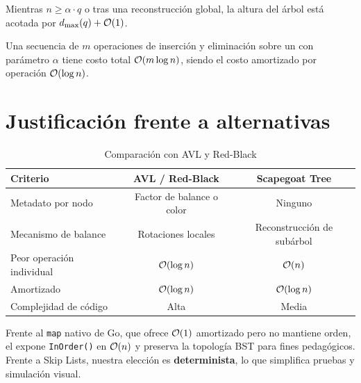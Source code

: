 \begin{invariante}
Mientras $n \geq \alpha \cdot q$ o tras una reconstrucción global, la altura del árbol está acotada por $d_{\max}(q) + \mathcal{O}(1)$.
\end{invariante}

\begin{teorema}
Una secuencia de $m$ operaciones de inserción y eliminación sobre un \Scapegoat{} con parámetro $\alpha$ tiene costo total $\mathcal{O}(m \log n)$, siendo el costo amortizado por operación $\mathcal{O}(\log n)$.
\end{teorema}

\section{Justificación frente a alternativas}

\begin{table}[H]
  \centering
  \caption{Comparación con AVL y Red-Black}
  \begin{tabular}{@{}lcc@{}}
    \toprule
    \textbf{Criterio} & \textbf{AVL / Red-Black} & \textbf{Scapegoat Tree} \\
    \midrule
    Metadato por nodo & Factor de balance o color & Ninguno \\
    Mecanismo de balance & Rotaciones locales & Reconstrucción de subárbol \\
    Peor operación individual & $\mathcal{O}(\log n)$ & $\mathcal{O}(n)$ \\
    Amortizado & $\mathcal{O}(\log n)$ & $\mathcal{O}(\log n)$ \\
    Complejidad de código & Alta & Media \\
    \bottomrule
  \end{tabular}
\end{table}

Frente al \texttt{map} nativo de Go, que ofrece $\mathcal{O}(1)$ amortizado pero no mantiene orden, el \Scapegoat{} expone \texttt{InOrder()} en $\mathcal{O}(n)$ y preserva la topología BST para fines pedagógicos. Frente a Skip Lists, nuestra elección es \textbf{determinista}, lo que simplifica pruebas y simulación visual.
